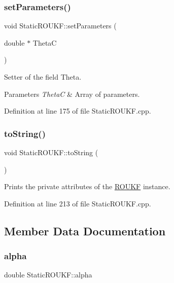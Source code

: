 \subsubsection{\texorpdfstring{set\+Parameters()}{setParameters()}}
{\footnotesize\ttfamily void Static\+R\+O\+U\+K\+F\+::set\+Parameters (\begin{DoxyParamCaption}\item[{double $\ast$}]{ThetaC }\end{DoxyParamCaption})\hspace{0.3cm}{\ttfamily [virtual]}}

Setter of the field {\ttfamily Theta}. 
\begin{DoxyParams}{Parameters}
{\em ThetaC} & Array of parameters. \\
\hline
\end{DoxyParams}


Definition at line 175 of file Static\+R\+O\+U\+K\+F.\+cpp.

\mbox{\label{classStaticROUKF_a1dda098190863474729ba15728b5943a}} 
\subsubsection{\texorpdfstring{to\+String()}{toString()}}
{\footnotesize\ttfamily void Static\+R\+O\+U\+K\+F\+::to\+String (\begin{DoxyParamCaption}{ }\end{DoxyParamCaption})}

Prints the private attributes of the \mbox{\hyperlink{classROUKF}{R\+O\+U\+KF}} instance. 

Definition at line 213 of file Static\+R\+O\+U\+K\+F.\+cpp.



\subsection{Member Data Documentation}
\mbox{\label{classStaticROUKF_a8b9ab6dd1eb28ac72f1d7f0d1f7f7685}} 
\subsubsection{\texorpdfstring{alpha}{alpha}}
{\footnotesize\ttfamily double Static\+R\+O\+U\+K\+F\+::alpha\hspace{0.3cm}{\ttfamily [private]}}

